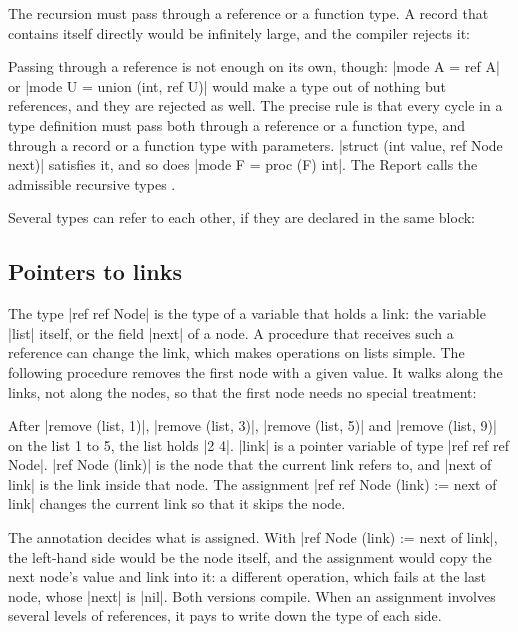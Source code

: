 The recursion must pass through a reference or a function type. A record
that contains itself directly would be infinitely large, and the compiler
rejects it:


Passing through a reference is not enough on its own, though:
\code|mode A = ref A| or \code|mode U = union (int, ref U)| would make a
type out of nothing but references, and they are rejected as well. The
precise rule is that every cycle in a type definition must pass both
through a reference or a function type, and through a record or a
function type with parameters. \code|struct (int value, ref Node next)|
satisfies it, and so does \code|mode F = proc (F) int|. The Report calls
the admissible recursive types .

Several types can refer to each other, if they are declared in the same
block:


\subsection*{Pointers to links}

The type \code|ref ref Node| is the type of a variable that holds a
link: the variable \code|list| itself, or the field \code|next| of a
node. A procedure that receives such a reference can change the link,
which makes operations on lists simple. The following procedure removes
the first node with a given value. It walks along the links, not along
the nodes, so that the first node needs no special treatment:


After \code|remove (list, 1)|, \code|remove (list, 3)|,
\code|remove (list, 5)| and \code|remove (list, 9)| on the list 1 to 5,
the list holds \code|2 4|. \code|link| is a pointer variable of type
\code|ref ref ref Node|. \code|ref Node (link)| is the node that the
current link refers to, and \code|next of link| is the link inside that
node. The assignment \code|ref ref Node (link) := next of link| changes
the current link so that it skips the node.

\begin{pitfall}
The annotation decides what is assigned. With
\code|ref Node (link) := next of link|, the left-hand side would be the
node itself, and the assignment would copy the next node's value and
link into it: a different operation, which fails at the last node, whose
\code|next| is \code|nil|. Both versions compile. When an assignment
involves several levels of references, it pays to write down the type of
each side.
\end{pitfall}

